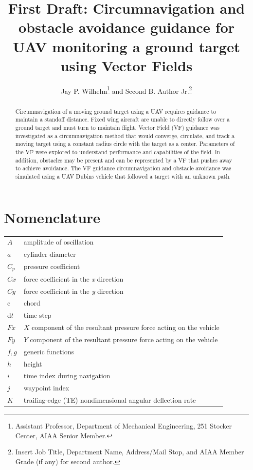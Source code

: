 \documentclass[conf]{new-aiaa}
\title{First Draft: Circumnavigation and obstacle avoidance guidance for UAV monitoring a ground target using Vector Fields}
\author{Jay P. Wilhelm\footnote{Assistant Professor, Department of Mechanical Engineering, 251 Stocker Center, AIAA Senior Member.} and Second B. Author Jr.\footnote{Insert Job Title, Department Name, Address/Mail Stop, and AIAA Member Grade (if any) for second author.}}
\affil{Ohio University, Athens, OH, 45701}
\begin{document}
\maketitle

\begin{abstract}
Circumnavigation of a moving ground target using a UAV requires guidance to maintain a standoff distance. Fixed wing aircraft are unable to directly follow over a ground target and must turn to maintain flight. Vector Field (VF) guidance was investigated as a circumnavigation method that would converge, circulate, and track a moving target using a constant radius circle with the target as a center. Parameters of the VF were explored to understand performance and capabilities of the field. In addition, obstacles may be present and can be represented by a VF that pushes away to achieve avoidance. The VF guidance circumnavigation and obstacle avoidance was simulated using a UAV Dubins vehicle that followed a target with an unknown path.
\end{abstract}

\section{Nomenclature}

{\renewcommand\arraystretch{1.0}
\noindent\begin{longtable*}{@{}l @{\quad=\quad} l@{}}
$A$  & amplitude of oscillation \\
$a$ &    cylinder diameter \\
$C_p$& pressure coefficient \\
$Cx$ & force coefficient in the \textit{x} direction \\
$Cy$ & force coefficient in the \textit{y} direction \\
c   & chord \\
d$t$ & time step \\
$Fx$ & $X$ component of the resultant pressure force acting on the vehicle \\
$Fy$ & $Y$ component of the resultant pressure force acting on the vehicle \\
$f, g$   & generic functions \\
$h$  & height \\
$i$  & time index during navigation \\
$j$  & waypoint index \\
$K$  & trailing-edge (TE) nondimensional angular deflection rate
\end{longtable*}}
\end{document}
